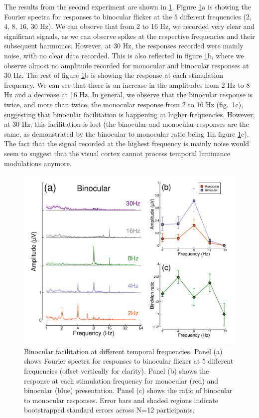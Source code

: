 \documentclass[
]{article}
\begin{document}
The results from the second experiment are shown in \ref{fig:TFdata}. Figure \ref{fig:TFdata}a is showing the Fourier spectra for responses to binocular flicker at the 5 different frequencies (2, 4, 8, 16, 30 Hz). We can observe that from 2 to 16 Hz, we recorded very clear and significant signals, as we can observe spikes at the respective frequencies and their subsequent harmonics. However, at 30 Hz, the responses recorded were mainly noise, with no clear data recorded. This is also reflected in figure \ref{fig:TFdata}b, where we observe almost no amplitude recorded for monocular and binocular responses at 30 Hz. The rest of figure \ref{fig:TFdata}b is showing the response at each stimulation frequency. We can see that there is an increase in the amplitudes from 2 Hz to 8 Hz and a decrease at 16 Hz. In general, we observe that the binocular response is twice, and more than twice, the monocular response from 2 to 16 Hz (fig.~\ref{fig:TFdata}c), suggesting that binocular facilitation is happening at higher frequencies. However, at 30 Hz, this facilitation is lost (the binocular and monocular responses are the same, as demonstrated by the binocular to monocular ratio being 1in figure \ref{fig:TFdata}c). The fact that the signal recorded at the highest frequency is mainly noise would seem to suggest that the visual cortex cannot process temporal luminance modulations anymore.

\begin{figure}

{\centering \includegraphics{Figures/TFdata} 

}

\caption{Binocular facilitation at different temporal frequencies. Panel (a) shows Fourier spectra for responses to binocular flicker at 5 different frequencies (offset vertically for clarity). Panel (b) shows the response at each stimulation frequency for monocular (red) and binocular (blue) presentation. Panel (c) shows the ratio of binocular to monocular responses. Error bars and shaded regions indicate bootstrapped standard errors across N=12 participants.}\label{fig:TFdata}
\end{figure}
\end{document}
